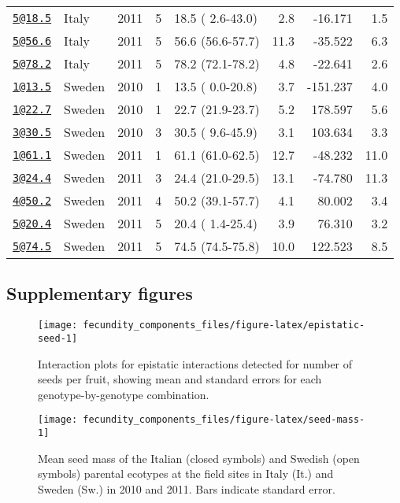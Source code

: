 \documentclass[
]{article}
\begin{document}
\begin{longtable}[]{@{}llrrlrrr@{}}
\href{mailto:5@18.5}{\nolinkurl{5@18.5}} & Italy & 2011 & 5 & 18.5 ( 2.6-43.0) & 2.8 & -16.171 & 1.5\tabularnewline
\href{mailto:5@56.6}{\nolinkurl{5@56.6}} & Italy & 2011 & 5 & 56.6 (56.6-57.7) & 11.3 & -35.522 & 6.3\tabularnewline
\href{mailto:5@78.2}{\nolinkurl{5@78.2}} & Italy & 2011 & 5 & 78.2 (72.1-78.2) & 4.8 & -22.641 & 2.6\tabularnewline
\href{mailto:1@13.5}{\nolinkurl{1@13.5}} & Sweden & 2010 & 1 & 13.5 ( 0.0-20.8) & 3.7 & -151.237 & 4.0\tabularnewline
\href{mailto:1@22.7}{\nolinkurl{1@22.7}} & Sweden & 2010 & 1 & 22.7 (21.9-23.7) & 5.2 & 178.597 & 5.6\tabularnewline
\href{mailto:3@30.5}{\nolinkurl{3@30.5}} & Sweden & 2010 & 3 & 30.5 ( 9.6-45.9) & 3.1 & 103.634 & 3.3\tabularnewline
\href{mailto:1@61.1}{\nolinkurl{1@61.1}} & Sweden & 2011 & 1 & 61.1 (61.0-62.5) & 12.7 & -48.232 & 11.0\tabularnewline
\href{mailto:3@24.4}{\nolinkurl{3@24.4}} & Sweden & 2011 & 3 & 24.4 (21.0-29.5) & 13.1 & -74.780 & 11.3\tabularnewline
\href{mailto:4@50.2}{\nolinkurl{4@50.2}} & Sweden & 2011 & 4 & 50.2 (39.1-57.7) & 4.1 & 80.002 & 3.4\tabularnewline
\href{mailto:5@20.4}{\nolinkurl{5@20.4}} & Sweden & 2011 & 5 & 20.4 ( 1.4-25.4) & 3.9 & 76.310 & 3.2\tabularnewline
\href{mailto:5@74.5}{\nolinkurl{5@74.5}} & Sweden & 2011 & 5 & 74.5 (74.5-75.8) & 10.0 & 122.523 & 8.5\tabularnewline
\bottomrule
\end{longtable}

\newpage

\hypertarget{supplementary-figures}{%
\subsection{Supplementary figures}\label{supplementary-figures}}

\begin{figure}

{\centering \texttt{[image: fecundity\_components\_files/figure-latex/epistatic-seed-1]} 

}

\caption[Epistatic interactions for seeds/fruit]{Interaction plots for epistatic interactions detected for number of seeds per fruit, showing mean and standard errors for each genotype-by-genotype combination.}\label{fig:epistatic-seed}
\end{figure}

\newpage

\begin{figure}

{\centering \texttt{[image: fecundity\_components\_files/figure-latex/seed-mass-1]} 

}

\caption[Seed mass among parental lines]{Mean seed mass of the Italian (closed symbols) and Swedish (open symbols) parental ecotypes at the field sites in Italy (It.) and Sweden (Sw.) in 2010 and 2011. Bars indicate standard error.}\label{fig:seed-mass}
\end{figure}
\end{document}
